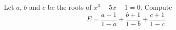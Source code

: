 Let $a$, $b$ and $c$ be the roots of $x^3-5x-1=0$. Compute
\[E=\dfrac{a+1}{1-a}+\dfrac{b+1}{1-b}+\dfrac{c+1}{1-c}.\]
